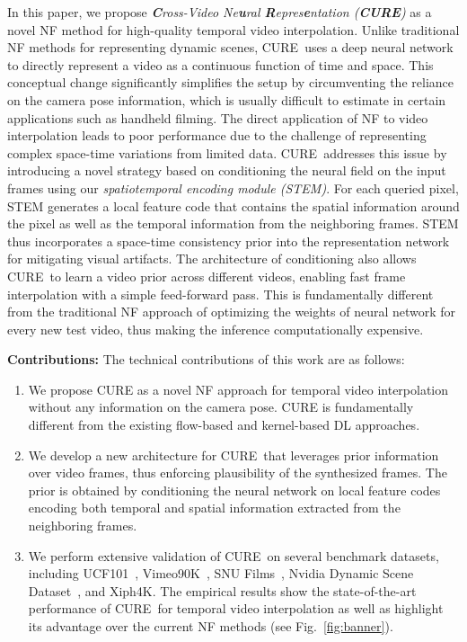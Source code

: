 \documentclass[12pt]{article}
\def\proposed{CURE}
\begin{document}
In this paper, we propose \emph{\textbf{C}ross-Video Ne\textbf{u}ral \textbf{R}epres\textbf{e}ntation (\textbf{CURE})} as a novel NF method for high-quality temporal video interpolation. Unlike traditional NF methods for representing dynamic scenes, \proposed~uses a deep neural network to directly represent a video as a continuous function of time and space. This conceptual change significantly simplifies the setup by circumventing the reliance on the camera pose information, which is usually difficult to estimate in certain applications such as handheld filming. The direct application of NF to video interpolation leads to poor performance due to the challenge of representing complex space-time variations from limited data. \proposed~addresses this issue by introducing a novel strategy based on conditioning the neural field on the input frames using our \emph{spatiotemporal encoding module (STEM)}.  For each queried pixel, STEM generates a local feature code that contains the spatial information around the pixel as well as the temporal information from the neighboring frames. STEM thus incorporates a space-time consistency prior into the representation network for mitigating visual artifacts. The architecture of conditioning also allows \proposed~to learn a video prior across different videos, enabling fast frame interpolation with a simple feed-forward pass. This is fundamentally different from the traditional NF approach of optimizing the weights of neural network for every new test video, thus making the inference computationally expensive.

\textbf{Contributions:} The technical contributions of this work are as follows:
\begin{enumerate}

\item 
We propose CURE as a novel NF approach for temporal video interpolation without any information on the camera pose. CURE is fundamentally different from the existing flow-based and kernel-based DL approaches.

\item
We develop a new architecture for \proposed~that leverages prior information over video frames, thus enforcing plausibility of the synthesized frames. The prior is obtained by conditioning the neural network on local feature codes encoding both temporal and spatial information extracted from the neighboring frames.

\item 
We perform extensive validation of \proposed~on several benchmark datasets, including UCF101~\cite{Soomro.etal2012}, Vimeo90K~\cite{Xue.etal2019}, SNU Films~\cite{choi2020channel}, Nvidia Dynamic Scene Dataset~\cite{yoon2020novel}, and Xiph4K. The empirical results show the state-of-the-art performance of \proposed~for temporal video interpolation as well as highlight its advantage over the current NF methods (see Fig.~\ref{fig:banner}). 

\end{enumerate}
\end{document}
